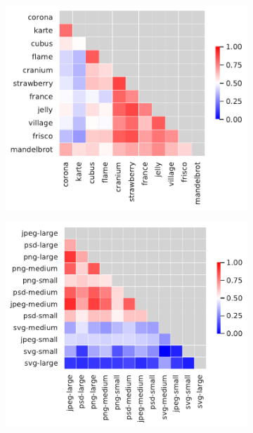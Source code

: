 \begin{figure}
	\centering
	\begin{subfigure}{0.33\textwidth}
		\centering
		\includegraphics[width=\linewidth]{images/rq1/kendall_batik.pdf}
		\caption{\batik}
	\end{subfigure}
	\begin{subfigure}{0.33\textwidth}
		\centering
		\includegraphics[width=\linewidth]{images/rq1/kendall_dconvert.pdf}
		\caption{\dconvert}
	\end{subfigure}

\end{figure}
